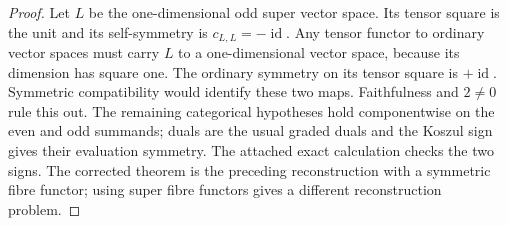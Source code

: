 \begin{proof}
Let $L$ be the one-dimensional odd super vector space. Its tensor square is the unit and its self-symmetry is $c_{L,L}=-\operatorname{id}$. Any tensor functor to ordinary vector spaces must carry $L$ to a one-dimensional vector space, because its dimension has square one. The ordinary symmetry on its tensor square is $+\operatorname{id}$. Symmetric compatibility would identify these two maps. Faithfulness and $2\ne0$ rule this out. The remaining categorical hypotheses hold componentwise on the even and odd summands; duals are the usual graded duals and the Koszul sign gives their evaluation symmetry. The attached exact calculation checks the two signs. The corrected theorem is the preceding reconstruction with a symmetric fibre functor; using super fibre functors gives a different reconstruction problem.
\end{proof}


